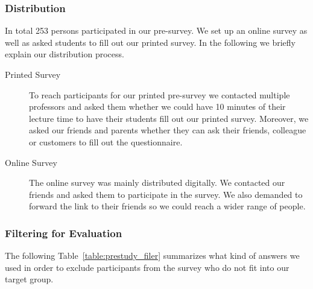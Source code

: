 \subsubsection{Distribution}
In total 253 persons participated in our pre-survey. We set up an online survey as well as asked students to fill out our printed survey. In the following we briefly explain our distribution process.

\begin{description}
	\item[Printed Survey] To reach participants for our printed pre-survey we contacted multiple professors and asked them whether we could have 10 minutes of their lecture time to have their students fill out our printed survey. Moreover, we asked our friends and parents whether they can ask their friends, colleague or customers to fill out the questionnaire.
	\item[Online Survey] The online survey was mainly distributed digitally. We contacted our friends and asked them to participate in the survey. We also demanded to forward the link to their friends so we could reach a wider range of people.
\end{description}

\subsubsection{Filtering for Evaluation}

The following Table~\ref{table:prestudy_filer} summarizes what kind of answers we used in order to exclude participants from the survey who do not fit into our target group.

